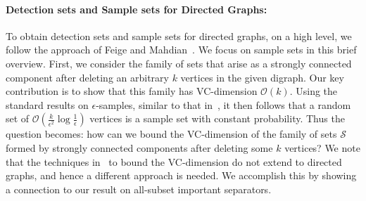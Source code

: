 \documentclass[11pt]{article}
\renewcommand{\SS}{\mathcal{S}}
\newcommand{\OO}{\mathcal{O}}
\begin{document}
\paragraph{Detection sets and Sample sets for Directed Graphs:}
To obtain detection sets and sample sets for directed graphs, on a high level, we follow the approach of Feige and Mahdian~\cite{fm06}.
We focus on sample sets in this brief overview. First, we consider the family of sets that arise as a strongly connected component after deleting an arbitrary $k$ vertices in the given digraph. Our key contribution is to show that this family has VC-dimension $\OO(k)$. Using the standard results on $\epsilon$-samples, similar to that in~\cite{fm06}, it then follows that a random set of $\OO(\frac{k}{\epsilon^2} \log \frac{1}{\epsilon})$ vertices is a sample set with constant probability. Thus the question becomes: how can we bound the VC-dimension of the family of sets $\SS$ formed by strongly connected components after deleting some $k$ vertices? We note that the techniques in~\cite{fm06} to bound the VC-dimension do not extend to directed graphs, and hence a different approach is needed. We accomplish this by showing a connection to our result on all-subset important separators. 
\end{document}
